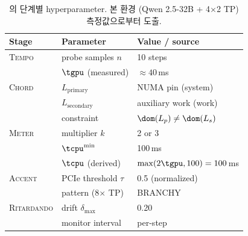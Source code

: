 
\begin{table}[t]
\centering
\caption{\algname 의 단계별 hyperparameter. 본 환경 (Qwen 2.5-32B + 4$\times$2 TP) 측정값으로부터 도출.}
\label{tbl:metronome-hyperparam}
\footnotesize
\begin{tabular}{@{}lll@{}}
\toprule
\textbf{Stage}        & \textbf{Parameter}      & \textbf{Value / source} \\
\midrule
\textsc{Tempo}        & probe samples $n$       & 10 steps \\
                      & $\tgpu$ (measured)      & $\approx 40$\,ms \\
\midrule
\textsc{Chord}        & $L_{\text{primary}}$    & NUMA pin (system) \\
                      & $L_{\text{secondary}}$  & auxiliary work (work) \\
                      & constraint              & $\dom(L_p) \neq \dom(L_s)$ \\
\midrule
\textsc{Meter}        & multiplier $k$          & 2 or 3 \\
                      & $\tcpu^{\min}$          & 100\,ms \\
                      & $\tcpu$ (derived)       & $\max(2\tgpu, 100) = 100$\,ms \\
\midrule
\textsc{Accent}       & PCIe threshold $\tau$   & 0.5 (normalized) \\
                      & pattern (8$\times$ TP)  & BRANCHY \\
\midrule
\textsc{Ritardando}   & drift $\delta_{\max}$    & 0.20 \\
                      & monitor interval        & per-step \\
\bottomrule
\end{tabular}
\end{table}
